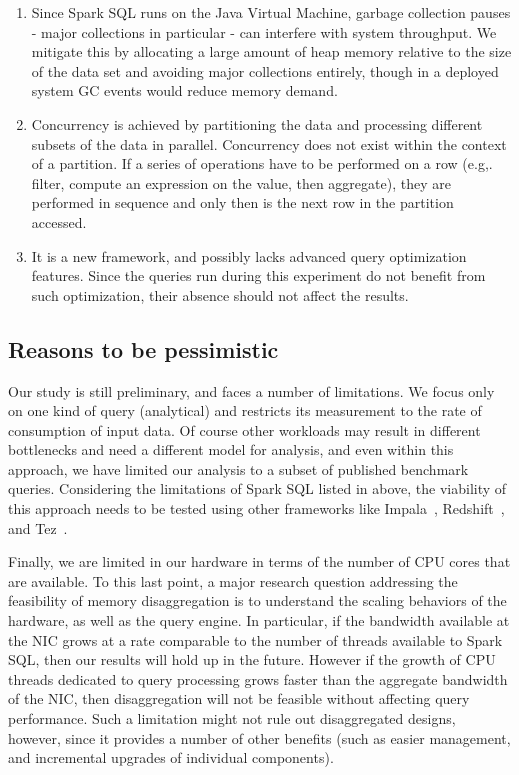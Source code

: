 \documentclass{sig-alternate-05-2015}
\begin{document}
\begin{enumerate}
\item Since Spark SQL runs on the Java Virtual Machine, garbage collection
pauses - major collections in particular - can interfere with system
throughput. We mitigate this by allocating a large amount of heap memory
relative to the size of the data set and avoiding major collections entirely,
though in a deployed system GC events would reduce memory demand.

\item Concurrency is achieved by partitioning the data and processing different
subsets of the data in parallel. Concurrency does not exist within the context
of a partition. If a series of operations have to be performed on a row (e.g,.
filter, compute an expression on the value, then aggregate), they are performed
in sequence and only then is the next row in the partition accessed.

\item It is a new framework, and possibly lacks advanced query optimization
features. Since the queries run during this experiment do not benefit from such
optimization, their absence should not affect the results.
\end{enumerate}

\subsection{Reasons to be pessimistic}

Our study is still preliminary, and faces a number of limitations.  We focus
only on one kind of query (analytical) and restricts its measurement to the
rate of consumption of input data. Of course other workloads may result in
different bottlenecks and need a different model for analysis, and even within
this approach, we have limited our analysis to a subset of published benchmark
queries.  Considering the limitations of Spark SQL listed in above, the
viability of this approach needs to be tested using other frameworks like
Impala~\cite{impala}, Redshift~\cite{redshift}, and Tez~\cite{tez}.

Finally, we are limited in our hardware in terms of the number of CPU cores
that are available.  To this last point, a major research question addressing
the feasibility of memory disaggregation is to understand the scaling behaviors
of the hardware, as well as the query engine.  In particular, if the bandwidth
available at the NIC grows at a rate comparable to the number of threads
available to Spark SQL, then our results will hold up in the future.  However
if the growth of CPU threads dedicated to query processing grows faster than
the aggregate bandwidth of the NIC, then disaggregation will not be feasible
without affecting query performance.  Such a limitation might not rule out
disaggregated designs, however, since it provides a number of other benefits
(such as easier management, and incremental upgrades of individual components).
\end{document}
